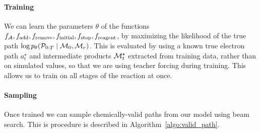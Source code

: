 \paragraph{Training}
We can learn the parameters $\theta$ of the functions $f_{{\mathcal{A}}}, f_{\textrm{add}}, f_{\textrm{remove}}, f_{\textrm{initial}},f_{\textrm{stop}}, f_{\textrm{reagent}}$, by maximizing the likelihood of the true path $\log p_\theta({\mathcal{P}}_{0:T} \mid {\mathcal{M}}_0, {\mathcal{M}}_r)$.
This is evaluated by using a known true electron path $a_t^\star$ and intermediate products ${\mathcal{M}}_t^\star$ extracted from training data,
rather than on simulated values, 
so that we are using teacher forcing \citep{williams1989learning} during training. 
This allows us to train on all stages of the reaction at once.

\paragraph{Sampling}
Once trained we can sample chemically-valid paths from our model using beam search.  This is procedure is described in Algorithm~\ref{algo:valid_path}. 



